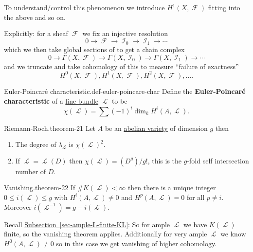 \documentclass[10pt,]{book}
\newcommand{\terminology}[1]{\textbf{#1}}
\numberwithin{equation}{section}
\newcommand{\sheaf}[1]{\operatorname{\mathcal{#1}}}
\newcommand{\lt}{<}
\begin{document}
\hypertarget{p-252}{}%
To understand/control this phenomenon we introduce \(H^1(X, \sheaf F)\) fitting into the above and so on.%
\par
\hypertarget{p-253}{}%
Explicitly: for a sheaf \(\sheaf F\) we fix an injective resolution%
\begin{equation*}
0\to \sheaf F \to \sheaf I_0 \to \sheaf I_1 \to \cdots
\end{equation*}
which we then take global sections of to get a chain complex%
\begin{equation*}
0\to \Gamma(X,\sheaf F) \to \Gamma(X,\sheaf I_0) \to \Gamma(X,\sheaf I_1) \to \cdots
\end{equation*}
and we truncate and take cohomology of this to measure ``failure of exactness''%
\begin{equation*}
H^0(X, \sheaf F) , H^1(X, \sheaf F) , H^2(X, \sheaf F) , \ldots\text{.}
\end{equation*}
%
\begin{definition}{Euler-Poincaré characteristic.}{def-euler-poincare-char}%
\hypertarget{p-254}{}%
Define the \terminology{Euler-Poincaré characteristic} of a \hyperref[def-line-bundle]{line bundle} \(\sheaf L\) to be%
\begin{equation*}
\chi(\sheaf L) = \sum (-1)^i \dim_k H^i(A,\sheaf L)\text{.}
\end{equation*}
%
\end{definition}
\begin{theorem}{Riemann-Roch.}{}{theorem-21}%
\hypertarget{p-255}{}%
Let \(A\) be an \hyperref[def-buntes-abvar]{abelian variety} of dimension \(g\) then\leavevmode%
\begin{enumerate}
\item\hypertarget{li-42}{}The degree of \(\lambda_{\sheaf L}\) is \(\chi(\sheaf L)^2\).%
\item\hypertarget{li-43}{}If \(\sheaf L = \sheaf L(D)\) then \(\chi(\sheaf L) = (D^g)/g!\), this is the \(g\)-fold self intersection number of \(D\).%
\end{enumerate}
%
\end{theorem}
\begin{theorem}{Vanishing.}{}{theorem-22}%
\hypertarget{p-256}{}%
If \(\#K( \sheaf L)\lt \infty\) then there is a unique integer \(0\le i(\sheaf L) \le g\) with \(H^i(A, \sheaf L) \ne  0\) and \(H^p(A, \sheaf L) = 0\) for all \(p \ne i\). Moreover \(i(\sheaf L^{-1}) = g - i(\sheaf L)\).%
\end{theorem}
\hypertarget{p-257}{}%
Recall \hyperref[sec-ample-L-finite-KL]{Subsection~\ref{sec-ample-L-finite-KL}}: So for ample \(\sheaf L\) we have \(K(\sheaf L)\) finite, so the vanishing theorem applies. Additionally for very ample \(\sheaf L\) we know \(H^0(A,\sheaf L) \ne 0\) so in this case we get vanishing of higher cohomology.%
\end{document}
